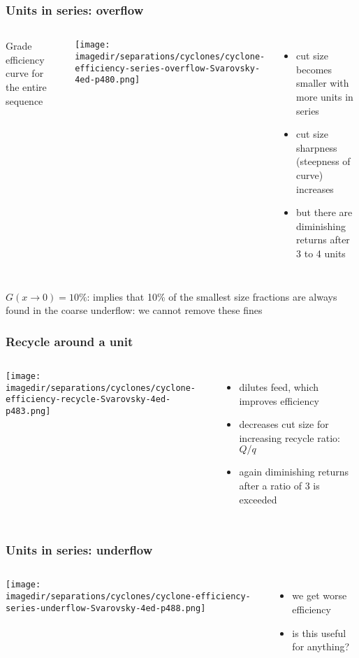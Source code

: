 \begin{frame}\frametitle{Units in series: overflow}
	\begin{columns}[t]
		Grade efficiency curve for the entire sequence
			\begin{center}
				\texttt{[image: \\imagedir/separations/cyclones/cyclone-efficiency-series-overflow-Svarovsky-4ed-p480.png]}
			\end{center}
		\begin{itemize}
			\item	cut size becomes smaller with more units in series
			\item	cut size sharpness (steepness of curve) increases
			\item	but there are diminishing returns after 3 to 4 units
		\end{itemize}
	\end{columns}
	\vspace{12pt}
	$G(x\rightarrow 0)=10\%$: implies that 10\% of the smallest size fractions are always found in the coarse underflow: we cannot remove these fines
\end{frame}

\begin{frame}\frametitle{Recycle around a unit}
	\begin{columns}[c]
			\begin{center}
				\texttt{[image: \\imagedir/separations/cyclones/cyclone-efficiency-recycle-Svarovsky-4ed-p483.png]}
			\end{center}
			\begin{itemize}
				\item	dilutes feed, which improves efficiency
				\item	decreases cut size for increasing recycle ratio: $Q/q$
				\item	again diminishing returns after a ratio of 3 is exceeded
			\end{itemize}
	\end{columns}
\end{frame}

\begin{frame}\frametitle{Units in series: underflow}
	\begin{columns}[t]
			\begin{center}
				\texttt{[image: \\imagedir/separations/cyclones/cyclone-efficiency-series-underflow-Svarovsky-4ed-p488.png]}
			\end{center}
		\begin{itemize}
			\item	we get worse efficiency
			\item	is this useful for anything?
		\end{itemize}
	\end{columns}
\end{frame}

